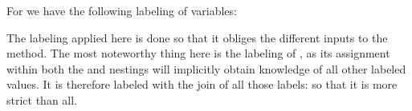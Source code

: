 For  we have the following labeling of variables:\\
\begin{minipage}{\linewidth}

\end{minipage}

The labeling applied here is done so that it obliges the different inputs to the method.
The most noteworthy thing here is the labeling of , as its assignment within both the  and  nestings will implicitly obtain knowledge of all other labeled values.
It is therefore labeled with the join of all those labels:  so that it is more strict than all.
